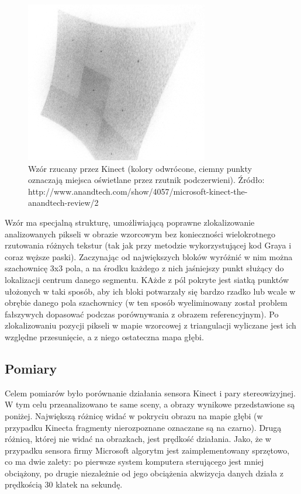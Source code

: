 \begin{figure}[h!]
\centering
\includegraphics[width=8cm]{../img/kinect_pattern}
\caption[Wzór rzucany przez Kinect]{Wzór rzucany przez Kinect (kolory odwrócone,
ciemny punkty oznaczają miejsca oświetlane przez rzutnik podczerwieni). Źródło:
http://www.anandtech.com/show/4057/microsoft-kinect-the-anandtech-review/2}
\label{fig:kinect_pattern}
\end{figure}

Wzór ma specjalną strukturę, umożliwiającą poprawne zlokalizowanie analizowanych
pikseli w obrazie wzorcowym bez konieczności wielokrotnego rzutowania różnych
tekstur (tak jak przy metodzie wykorzystującej kod Graya i coraz węższe paski).
Zaczynając od największych bloków wyróżnić w nim można szachownicę 3x3 pola, a na
środku każdego z nich jaśniejszy punkt służący do lokalizacji centrum danego segmentu.
KAżde z pól pokryte jest siatką punktów ułożonych w taki sposób, aby ich bloki
potwarzały się bardzo rzadko lub wcale w obrębie danego pola szachownicy (w ten
sposób wyeliminowany został problem fałszywych dopasować podczas porównywania
z obrazem referencyjnym). Po zlokalizowaniu pozycji pikseli w mapie wzorcowej
z triangulacji wyliczane jest ich względne przesunięcie, a z niego ostateczna
mapa głębi.

\subsection{Pomiary}

Celem pomiarów było porównanie działania sensora Kinect i pary stereowizyjnej.
W tym celu przeanalizowano te same sceny, a obrazy wynikowe przedstawione są
poniżej. Największą różnicę widać w pokryciu obrazu na mapie głębi (w przypadku
Kinecta fragmenty nierozpoznane oznaczane są na czarno). Drugą różnicą, której
nie widać na obrazkach, jest prędkość działania. Jako, że w przypadku sensora
firmy Microsoft algorytm jest zaimplementowany sprzętowo, co ma dwie zalety:
po pierwsze system komputera sterującego jest mniej obciążony, po drugie niezależnie
od jego obciążenia akwizycja danych działa z prędkością 30 klatek na sekundę.

